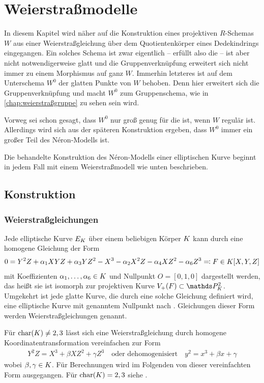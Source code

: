 \chapter{Weierstraßmodelle}\label{chap:weierstraßmodelle}
In diesem Kapitel wird näher auf die Konstruktion eines
projektiven $R$-Schemas $W$ aus einer Weierstraßgleichung über dem
Quotientenkörper eines Dedekindrings eingegangen.
Ein solches Schema ist zwar eigentlich – erfüllt also die \NAbbEig – ist
aber nicht notwendigerweise glatt und die Gruppenverknüpfung
erweitert sich nicht immer zu einem Morphismus auf ganz $W$.
Immerhin letzteres ist auf dem Unterschema $W^0$ der glatten Punkte
von $W$ behoben. Denn hier erweitert sich die Gruppenverknüpfung und
macht $W^0$ zum Gruppenschema, wie in \autoref{chap:weierstraßgruppe}
zu sehen sein wird.

Vorweg sei schon gesagt, dass $W^0$ nur groß genug für die
\NAbbEig ist, wenn $W$ regulär ist. Allerdings wird sich aus
der späteren Konstruktion ergeben, dass $W^0$ immer ein großer Teil
des Néron-Modells ist.

Die behandelte Konstruktion des Néron-Modells einer elliptischen Kurve
beginnt in jedem Fall mit einem Weierstraßmodell wie unten beschrieben.

\section{Konstruktion}
\subsection{Weierstraßgleichungen}
Jede elliptische Kurve $E_{K}$ über einem beliebigen Körper $K$ kann
durch eine homogene Gleichung der Form
\begin{gather*}
  0 = Y^2 Z + \alpha_1 XYZ + \alpha_3 YZ^2 - X^3 - \alpha_2X^2 Z - \alpha_4 XZ^2 - \alpha_6 Z^3
  \eqqcolon F\in K[X,Y,Z]
\end{gather*}
mit Koeffizienten $\alpha_1,\dotsc,\alpha_6\in K$ und Nullpunkt $O=[0,1,0]$
dargestellt werden, das heißt sie ist isomorph zur projektiven Kurve
$V_+(F)\subset\P_\K^2$.
Umgekehrt ist jede glatte Kurve, die durch eine
solche Gleichung definiert wird, eine elliptische Kurve mit genanntem
Nullpunkt nach \cite[Proposition~III.3.1]{silverman}.
Gleichungen dieser Form werden Weierstraßgleichungen genannt.

Für $\operatorname{char}(K)\neq 2,3$ lässt sich eine Weierstraßgleichung durch
homogene Koordinatentransformation vereinfachen zur Form
\begin{gather*}
  Y^2 Z = X^3 + \beta XZ^2 + \gamma Z^3
  \quad\text{oder dehomogenisiert}\quad
  y^2 = x^3 + \beta x + \gamma
\end{gather*}
wobei $\beta,\gamma\in K$.
Für Berechnungen wird im Folgenden von dieser vereinfachten Form
ausgegangen. Für $\operatorname{char}(K)=2,3$ siehe
\cite[Appendix: Elliptic Curves in Characteristics 2~and 3]{silverman}.


